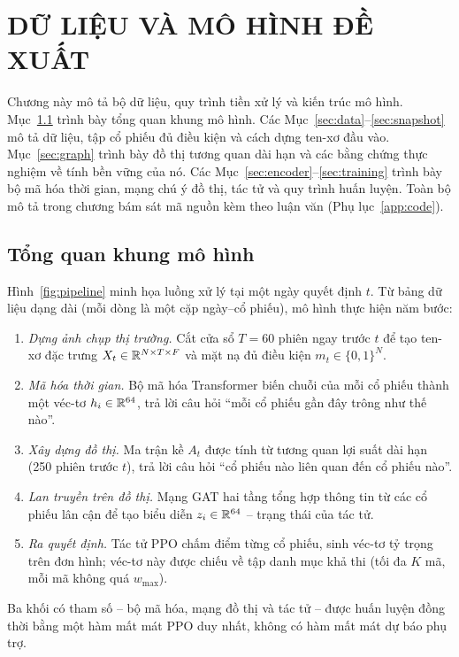 \chapter{DỮ LIỆU VÀ MÔ HÌNH ĐỀ XUẤT}
\label{ch:mohinh}

Chương này mô tả bộ dữ liệu, quy trình tiền xử lý và kiến trúc mô hình. Mục~\ref{sec:overview} trình bày tổng quan khung mô hình. Các Mục~\ref{sec:data}--\ref{sec:snapshot} mô tả dữ liệu, tập cổ phiếu đủ điều kiện và cách dựng ten-xơ đầu vào. Mục~\ref{sec:graph} trình bày đồ thị tương quan dài hạn và các bằng chứng thực nghiệm về tính bền vững của nó. Các Mục~\ref{sec:encoder}--\ref{sec:training} trình bày bộ mã hóa thời gian, mạng chú ý đồ thị, tác tử và quy trình huấn luyện. Toàn bộ mô tả trong chương bám sát mã nguồn kèm theo luận văn (Phụ lục~\ref{app:code}).

\section{Tổng quan khung mô hình}
\label{sec:overview}

Hình~\ref{fig:pipeline} minh họa luồng xử lý tại một ngày quyết định $t$. Từ bảng dữ liệu dạng dài (mỗi dòng là một cặp ngày--cổ phiếu), mô hình thực hiện năm bước:
\begin{enumerate}[leftmargin=1.6cm]
  \item \textit{Dựng ảnh chụp thị trường.} Cắt cửa sổ $T=60$ phiên ngay trước $t$ để tạo ten-xơ đặc trưng $X_t\in\mathbb{R}^{N\times T\times F}$ và mặt nạ đủ điều kiện $m_t\in\{0,1\}^N$.
  \item \textit{Mã hóa thời gian.} Bộ mã hóa Transformer biến chuỗi của mỗi cổ phiếu thành một véc-tơ $h_i\in\mathbb{R}^{64}$, trả lời câu hỏi ``mỗi cổ phiếu gần đây trông như thế nào''.
  \item \textit{Xây dựng đồ thị.} Ma trận kề $A_t$ được tính từ tương quan lợi suất dài hạn (250 phiên trước $t$), trả lời câu hỏi ``cổ phiếu nào liên quan đến cổ phiếu nào''.
  \item \textit{Lan truyền trên đồ thị.} Mạng GAT hai tầng tổng hợp thông tin từ các cổ phiếu lân cận để tạo biểu diễn $z_i\in\mathbb{R}^{64}$ -- trạng thái của tác tử.
  \item \textit{Ra quyết định.} Tác tử PPO chấm điểm từng cổ phiếu, sinh véc-tơ tỷ trọng trên đơn hình; véc-tơ này được chiếu về tập danh mục khả thi (tối đa $K$ mã, mỗi mã không quá $w_{\max}$).
\end{enumerate}
Ba khối có tham số -- bộ mã hóa, mạng đồ thị và tác tử -- được huấn luyện đồng thời bằng một hàm mất mát PPO duy nhất, không có hàm mất mát dự báo phụ trợ.

